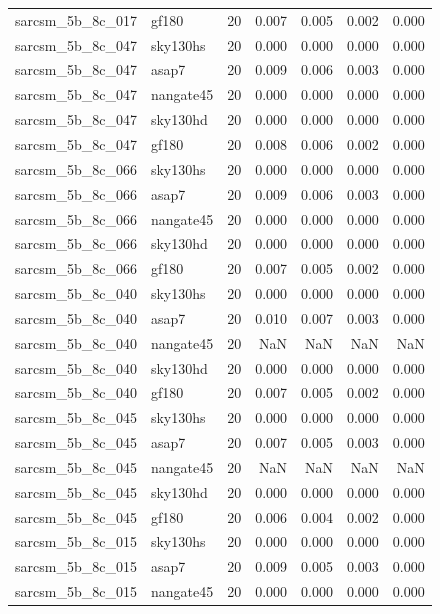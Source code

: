 \begin{tabular}{llrrrrr}
sarcsm\_5b\_8c\_017 & gf180 & 20 & 0.007 & 0.005 & 0.002 & 0.000 \\
sarcsm\_5b\_8c\_047 & sky130hs & 20 & 0.000 & 0.000 & 0.000 & 0.000 \\
sarcsm\_5b\_8c\_047 & asap7 & 20 & 0.009 & 0.006 & 0.003 & 0.000 \\
sarcsm\_5b\_8c\_047 & nangate45 & 20 & 0.000 & 0.000 & 0.000 & 0.000 \\
sarcsm\_5b\_8c\_047 & sky130hd & 20 & 0.000 & 0.000 & 0.000 & 0.000 \\
sarcsm\_5b\_8c\_047 & gf180 & 20 & 0.008 & 0.006 & 0.002 & 0.000 \\
sarcsm\_5b\_8c\_066 & sky130hs & 20 & 0.000 & 0.000 & 0.000 & 0.000 \\
sarcsm\_5b\_8c\_066 & asap7 & 20 & 0.009 & 0.006 & 0.003 & 0.000 \\
sarcsm\_5b\_8c\_066 & nangate45 & 20 & 0.000 & 0.000 & 0.000 & 0.000 \\
sarcsm\_5b\_8c\_066 & sky130hd & 20 & 0.000 & 0.000 & 0.000 & 0.000 \\
sarcsm\_5b\_8c\_066 & gf180 & 20 & 0.007 & 0.005 & 0.002 & 0.000 \\
sarcsm\_5b\_8c\_040 & sky130hs & 20 & 0.000 & 0.000 & 0.000 & 0.000 \\
sarcsm\_5b\_8c\_040 & asap7 & 20 & 0.010 & 0.007 & 0.003 & 0.000 \\
sarcsm\_5b\_8c\_040 & nangate45 & 20 & NaN & NaN & NaN & NaN \\
sarcsm\_5b\_8c\_040 & sky130hd & 20 & 0.000 & 0.000 & 0.000 & 0.000 \\
sarcsm\_5b\_8c\_040 & gf180 & 20 & 0.007 & 0.005 & 0.002 & 0.000 \\
sarcsm\_5b\_8c\_045 & sky130hs & 20 & 0.000 & 0.000 & 0.000 & 0.000 \\
sarcsm\_5b\_8c\_045 & asap7 & 20 & 0.007 & 0.005 & 0.003 & 0.000 \\
sarcsm\_5b\_8c\_045 & nangate45 & 20 & NaN & NaN & NaN & NaN \\
sarcsm\_5b\_8c\_045 & sky130hd & 20 & 0.000 & 0.000 & 0.000 & 0.000 \\
sarcsm\_5b\_8c\_045 & gf180 & 20 & 0.006 & 0.004 & 0.002 & 0.000 \\
sarcsm\_5b\_8c\_015 & sky130hs & 20 & 0.000 & 0.000 & 0.000 & 0.000 \\
sarcsm\_5b\_8c\_015 & asap7 & 20 & 0.009 & 0.005 & 0.003 & 0.000 \\
sarcsm\_5b\_8c\_015 & nangate45 & 20 & 0.000 & 0.000 & 0.000 & 0.000 \\

\end{tabular}
